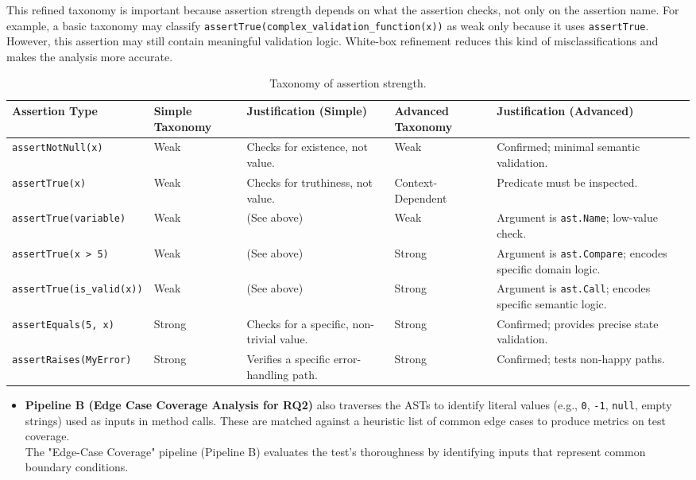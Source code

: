 \documentclass[conference]{IEEEtran}
\begin{document}
This refined taxonomy is important because assertion strength depends on what the assertion checks, not only on the assertion name. For example, a basic taxonomy may classify \texttt{assertTrue(complex\_validation\_function(x))} as weak only because it uses \texttt{assertTrue}. However, this assertion may still contain meaningful validation logic. White-box refinement reduces this kind of misclassifications and makes the analysis more accurate.

\begin{table}[h!]
\centering
\caption{Taxonomy of assertion strength.}
\begin{tabular}{|p{3.5cm}|p{2.2cm}|p{4cm}|p{3cm}|p{4cm}|}
\hline
\textbf{Assertion Type} &
\textbf{Simple Taxonomy} &
\textbf{Justification (Simple)} &
\textbf{Advanced Taxonomy} &
\textbf{Justification (Advanced)} \\
\hline

\texttt{assertNotNull(x)} &
Weak &
Checks for existence, not value. &
Weak &
Confirmed; minimal semantic validation. \\
\hline

\texttt{assertTrue(x)} &
Weak &
Checks for truthiness, not value. &
Context-Dependent &
Predicate must be inspected. \\
\hline

\texttt{assertTrue(variable)} &
Weak &
(See above) &
Weak &
Argument is \texttt{ast.Name}; low-value check. \\
\hline

\texttt{assertTrue(x > 5)} &
Weak &
(See above) &
Strong &
Argument is \texttt{ast.Compare}; encodes specific domain logic. \\
\hline

\texttt{assertTrue(is\_valid(x))} &
Weak &
(See above) &
Strong &
Argument is \texttt{ast.Call}; encodes specific semantic logic. \\
\hline

\texttt{assertEquals(5, x)} &
Strong &
Checks for a specific, non-trivial value. &
Strong &
Confirmed; provides precise state validation. \\
\hline

\texttt{assertRaises(MyError)} &
Strong &
Verifies a specific error-handling path. &
Strong &
Confirmed; tests non-happy paths. \\
\hline

\end{tabular}
\end{table}
    \begin{itemize}
   \item  \textbf{Pipeline B (Edge Case Coverage Analysis for RQ2)} also traverses the ASTs to identify literal values (e.g., \texttt{0}, \texttt{-1}, \texttt{null}, empty strings) used as inputs in method calls. These are matched against a heuristic list of common edge cases to produce metrics on test coverage.\\
    The "Edge-Case Coverage" pipeline (Pipeline B) evaluates the test's thoroughness by identifying inputs that represent common boundary conditions.\\
    \end{itemize}
\end{document}
